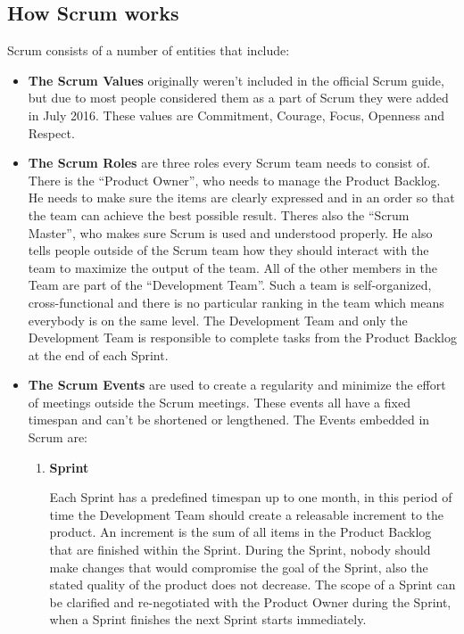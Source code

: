 \subsection{How Scrum works}
Scrum consists of a number of entities that include:
\begin{itemize}
    \item \textbf{The Scrum Values} originally weren't included in the official Scrum guide, but due to most people considered them as a part of Scrum they were added in July 2016. These values are Commitment, Courage, Focus, Openness and Respect.

    \item \textbf{The Scrum Roles} are three roles every Scrum team needs to consist of. There is the ``Product Owner'', who needs to manage the Product Backlog. He needs to make sure the items are clearly expressed and in an order so that the team can achieve the best possible result. Theres also the ``Scrum Master'', who makes sure Scrum is used and understood properly. He also tells people outside of the Scrum team how they should interact with the team to maximize the output of the team. All of the other members in the Team are part of the ``Development Team''. Such a team is self-organized, cross-functional and there is no particular ranking in the team which means everybody is on the same level. The Development Team and only the Development Team is responsible to complete tasks from the Product Backlog at the end of each Sprint.

    \item \textbf{The Scrum Events} are used to create a regularity and minimize the effort of meetings outside the Scrum meetings. These events all have a fixed timespan and can't be shortened or lengthened. The Events embedded in Scrum are:
    \begin{enumerate}
        \item \textbf{Sprint}

        Each Sprint has a predefined timespan up to one month, in this period of time the Development Team should create a releasable increment to the product. An increment is the sum of all items in the Product Backlog that are finished within the Sprint. During the Sprint, nobody should make changes that would compromise the goal of the Sprint, also the stated quality of the product does not decrease. The scope of a Sprint can be clarified and re-negotiated with the Product Owner during the Sprint, when a Sprint finishes the next Sprint starts immediately.


\end{enumerate}
\end{itemize}
